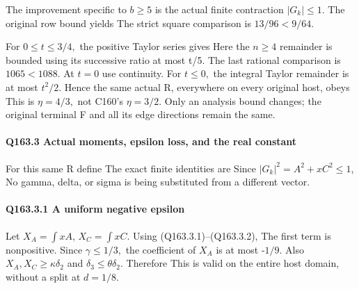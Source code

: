 The improvement specific to \(b\ge 5\) is the actual finite contraction
\(|G_k|\le1\). The original row bound yields
The strict square comparison is \(13/96<9/64.\)

For \(0\le t\le 3/4,\allowbreak \) the positive Taylor series gives
Here the \(n\ge 4\) remainder is bounded using its successive ratio at most t/5.
The last rational comparison is \(1065<1088.\) At \(t=0\) use continuity.
For \(t\le 0,\allowbreak \) the integral Taylor remainder is at most \(t^2/2.\) Hence the same
actual R, everywhere on every original host, obeys
This is \(\eta=4/3,\allowbreak \) not C160's \(\eta=3/2.\) Only an analysis bound changes;
the original terminal F and all its edge directions remain the same.

\paragraph{Q163.3 Actual moments, epsilon loss, and the real constant}

For this same R define
The exact finite identities are
Since \(|G_k|^2=A^2+xC^2\le1\),
No gamma, delta, or sigma is being substituted from a different vector.

\paragraph{Q163.3.1 A uniform negative epsilon}

Let \(X_A= \int xA\), \(X_C= \int xC\).
Using (Q163.3.1)--(Q163.3.2),
The first term is nonpositive. Since \(\gamma\le 1/3,\allowbreak \) the coefficient of \(X_A\)
is at most -\(1/9.\) Also \(X_A,\allowbreak  X_C\ge \kappa \delta_2\) and \(\delta_3\le \theta \delta_2.\) Therefore
This is valid on the entire host domain, without a split at \(d=1/8.\)

